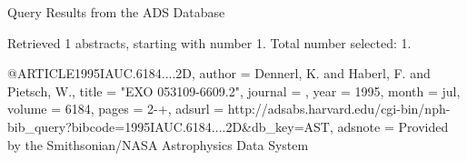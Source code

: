 Query Results from the ADS Database


Retrieved 1 abstracts, starting with number 1.  Total number selected: 1.

@ARTICLE{1995IAUC.6184....2D,
   author = {{Dennerl}, K. and {Haberl}, F. and {Pietsch}, W.},
    title = "{EXO 053109-6609.2}",
  journal = {\iaucirc},
     year = 1995,
    month = jul,
   volume = 6184,
    pages = {2-+},
   adsurl = {http://adsabs.harvard.edu/cgi-bin/nph-bib_query?bibcode=1995IAUC.6184....2D&db_key=AST},
  adsnote = {Provided by the Smithsonian/NASA Astrophysics Data System}
}


